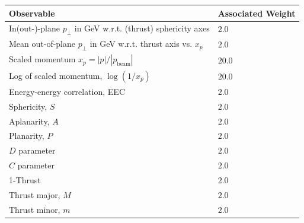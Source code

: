 \documentclass[aps,preprint,floatfix,nofootinbib,showpacs]{revtex4-1}
\begin{document}
\begin{table}[tbp]
\begin{center}
\begin{tabular}{l|l}
\hline \hline 
Observable \hspace{1cm}                                        &  Associated Weight \\ \hline
In(out-)-plane $p_\bot$ in GeV w.r.t. (thrust) sphericity axes & \hspace{1cm} $2.0$ \\ \hline 
Mean out-of-plane $p_\bot$ in GeV w.r.t. thrust axis vs. $x_p$ & \hspace{1cm} $2.0$ \\ \hline
Scaled momentum $x_p=|p|/|p_\text{beam}|$                      & \hspace{1cm} $20.0$ \\ \hline
Log of scaled momentum, $\log(1/x_p)$                          & \hspace{1cm} $20.0$ \\ \hline
Energy-energy correlation, EEC                                 & \hspace{1cm} $2.0$ \\ \hline
Sphericity, $S$                                                & \hspace{1cm} $2.0$ \\ \hline
Aplanarity, $A$                                                & \hspace{1cm} $2.0$ \\ \hline
Planarity, $P$                                                 & \hspace{1cm} $2.0$ \\ \hline
$D$ parameter                                                  & \hspace{1cm} $2.0$ \\ \hline
$C$ parameter                                                  & \hspace{1cm} $2.0$ \\ \hline
1-Thrust                                                       & \hspace{1cm} $2.0$ \\ \hline
Thrust major, $M$                                              & \hspace{1cm} $2.0$ \\ \hline
Thrust minor, $m$                                              & \hspace{1cm} $2.0$\\ \hline

\end{tabular}
\end{center}
\end{table}
\end{document}
